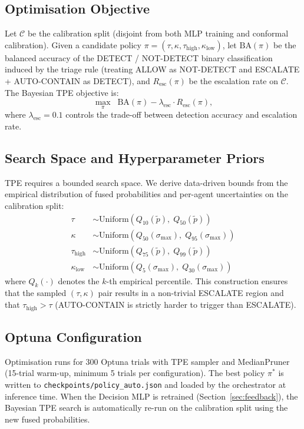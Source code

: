 \documentclass[journal]{IEEEtran}
\newcommand{\tauh}{\tau_{\mathrm{high}}}
\newcommand{\klow}{\kappa_{\mathrm{low}}}
\newcommand{\pfused}{\tilde{p}}
\begin{document}
\subsection{Optimisation Objective}

Let $\mathcal{C}$ be the calibration split (disjoint from both MLP
training and conformal calibration).
Given a candidate policy $\pi = (\tau, \kappa, \tauh, \klow)$,
let $\mathrm{BA}(\pi)$ be the balanced accuracy of the DETECT /
NOT-DETECT binary classification induced by the triage rule
(treating ALLOW as NOT-DETECT and ESCALATE + AUTO-CONTAIN as DETECT),
and $R_{\mathrm{esc}}(\pi)$ be the escalation rate on $\mathcal{C}$.
The Bayesian TPE objective is:
\begin{equation}
  \max_{\pi} \;\; \mathrm{BA}(\pi) - \lambda_{\mathrm{esc}} \cdot R_{\mathrm{esc}}(\pi),
  \label{eq:tpe_objective}
\end{equation}
where $\lambda_{\mathrm{esc}} = 0.1$ controls the trade-off between
detection accuracy and escalation rate.

\subsection{Search Space and Hyperparameter Priors}

TPE requires a bounded search space.
We derive data-driven bounds from the empirical distribution of fused
probabilities and per-agent uncertainties on the calibration split:
\begin{align}
  \tau       &\sim \mathrm{Uniform}(Q_{10}(\pfused),\; Q_{50}(\pfused)) \\
  \kappa     &\sim \mathrm{Uniform}(Q_{50}(\sigma_{\max}),\; Q_{95}(\sigma_{\max})) \\
  \tauh      &\sim \mathrm{Uniform}(Q_{75}(\pfused),\; Q_{99}(\pfused)) \\
  \klow      &\sim \mathrm{Uniform}(Q_{5}(\sigma_{\max}),\; Q_{30}(\sigma_{\max}))
\end{align}
where $Q_k(\cdot)$ denotes the $k$-th empirical percentile.
This construction ensures that the sampled $(\tau, \kappa)$ pair results
in a non-trivial ESCALATE region and that $\tauh > \tau$ (AUTO-CONTAIN
is strictly harder to trigger than ESCALATE).

\subsection{Optuna Configuration}

Optimisation runs for 300 Optuna trials with TPE sampler and
MedianPruner (15-trial warm-up, minimum 5 trials per configuration).
The best policy $\pi^*$ is written to \texttt{checkpoints/policy\_auto.json}
and loaded by the orchestrator at inference time.
When the Decision MLP is retrained (Section~\ref{sec:feedback}), the
Bayesian TPE search is automatically re-run on the calibration split
using the new fused probabilities.
\end{document}
